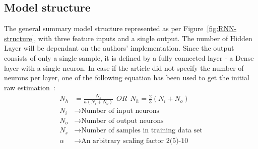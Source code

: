 \subsection{Model structure} \label{subsec:structure}
The general summary model structure represented as per Figure~\ref{fig:RNN-structure}, with three feature inputs and a single output.
The number of Hidden Layer will be dependant on the authors' implementation.
Since the output consists of only a single sample, it is defined by a fully connected layer - a Dense layer with a single neuron.
In case if the article did not specify the number of neurons per layer, one of the following equation has been used to get the initial raw estimation~\cite{eckhardt_choosing_2018}:
\begin{equation}
    \begin{split}
        N_h &= \frac{N_s}{ a \left(N_i+N_o \right)} \ \ OR \ \ N_h = \frac{2}{3}\left(N_i+N_o \right) \\
        N_i &\rightarrow \text{Number of input neurons} \\
        N_o &\rightarrow \text{Number of output neurons} \\
        N_s &\rightarrow \text{Number of samples in training data set} \\
        \alpha &\rightarrow \text{An arbitrary scaling factor 2(5)-10}
    \end{split}
\end{equation}


